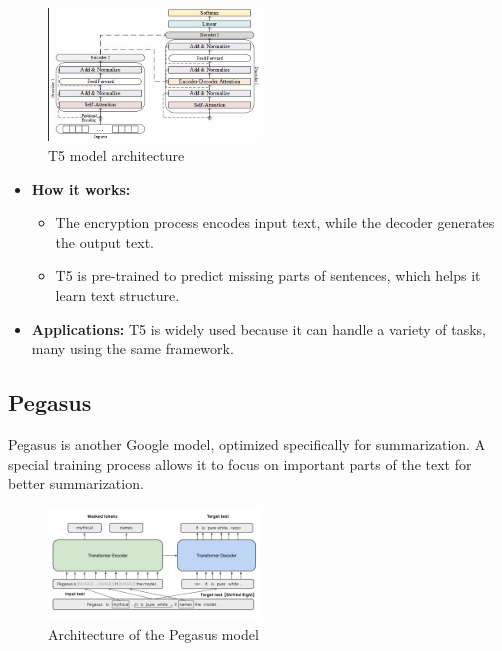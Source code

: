 \documentclass[conference]{IEEEtran}
\begin{document}
\begin{figure}[htbp]
    \centering
    \includegraphics[width=0.5\textwidth]{T5 Arch .png} %
    \caption{T5 model architecture}
    \label{fig:t5_architecture}
\end{figure}

\begin{itemize}
    \item \textbf{How it works:}
    \begin{itemize}
        \item The encryption process encodes input text, while the decoder generates the output text.
        \item T5 is pre-trained to predict missing parts of sentences, which helps it learn text structure.
    \end{itemize}
    \item \textbf{Applications:} T5 is widely used because it can handle a variety of tasks, many using the same framework.
\end{itemize}



\subsection{Pegasus}
Pegasus is another Google model, optimized specifically for summarization. A special training process allows it to focus on important parts of the text for better summarization.

\begin{figure}[htbp]
    \centering
    \includegraphics[width=0.5\textwidth]{Pegasus Arch.png} %
    \caption{Architecture of the Pegasus model}
    \label{fig:pegasus_architecture}
\end{figure}
\end{document}
